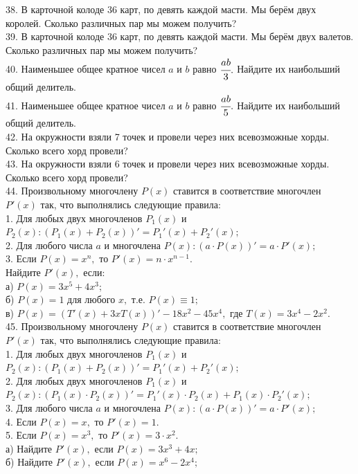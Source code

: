 \documentclass[12pt]{article}
\begin{document}
38. В карточной колоде 36 карт, по девять каждой масти. Мы берём двух королей. Сколько различных пар мы можем получить?\\
39. В карточной колоде 36 карт, по девять каждой масти. Мы берём двух валетов. Сколько различных пар мы можем получить?\\
40. Наименьшее общее кратное чисел $a$ и $b$ равно $\cfrac{ab}{3}.$ Найдите их наибольший общий делитель.\\
41. Наименьшее общее кратное чисел $a$ и $b$ равно $\cfrac{ab}{5}.$ Найдите их наибольший общий делитель.\\
42. На окружности взяли 7 точек и провели через них всевозможные хорды. Сколько всего хорд провели?\\
43. На окружности взяли 6 точек и провели через них всевозможные хорды. Сколько всего хорд провели?\\
44. Произвольному многочлену $P(x)$ ставится в соответствие многочлен $P'(x)$ так, что выполнялись следующие правила:\\
1. Для любых двух многочленов $P_1(x)$ и $P_2(x): \left(P_1(x)+P_2(x)\right)'=P_1'(x)+P_2'(x);$\\
2. Для любого числа $a$ и многочлена $P(x): (a\cdot P(x))'=a\cdot P'(x);$\\
3. Если $P(x)=x^n,$ то $P'(x)=n\cdot x^{n-1}.$\\
Найдите $P'(x),$ если:\\
а) $P(x)=3x^5+4x^3;$\\
б) $P(x)=1$ для любого $x,$ т.е. $P(x)\equiv 1;$\\
в) $P(x)=(T'(x)+3xT(x))'-18x^2-45x^4,$ где $T(x)=3x^4-2x^2.$\\
45. Произвольному многочлену $P(x)$ ставится в соответствие многочлен $P'(x)$ так, что выполнялись следующие правила:\\
1. Для любых двух многочленов $P_1(x)$ и $P_2(x): \left(P_1(x)+P_2(x)\right)'=P_1'(x)+P_2'(x);$\\
2. Для любых двух многочленов $P_1(x)$ и $P_2(x): (P_1(x)\cdot P_2(x))'=P_1'(x)\cdot P_2(x)+P_1(x)\cdot P_2'(x);$\\
3. Для любого числа $a$ и многочлена $P(x): (a\cdot P(x))'=a\cdot P'(x);$\\
4. Если $P(x)=x,$ то $P'(x)=1.$\\
5. Если $P(x)=x^3,$ то $P'(x)=3\cdot x^2.$\\
а) Найдите $P'(x),$ если $P(x)=3x^3+4x;$\\
б) Найдите $P'(x),$ если $P(x)=x^6-2x^4;$\\
\end{document}
